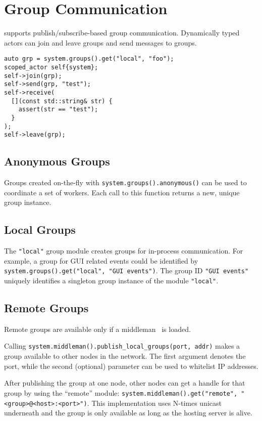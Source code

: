 \section{Group Communication}
\label{groups}

\lib supports publish/subscribe-based group communication.
Dynamically typed actors can join and leave groups and send messages to groups.

\begin{lstlisting}
auto grp = system.groups().get("local", "foo");
scoped_actor self{system};
self->join(grp);
self->send(grp, "test");
self->receive(
  [](const std::string& str) {
    assert(str == "test");
  }
);
self->leave(grp);
\end{lstlisting}

\subsection{Anonymous Groups}
\label{anonymous-group}

Groups created on-the-fly with \lstinline^system.groups().anonymous()^ can be used to coordinate a set of workers.
Each call to this function returns a new, unique group instance.

\subsection{Local Groups}
\label{local-group}

The \lstinline^"local"^ group module creates groups for in-process communication.
For example, a group for GUI related events could be identified by \lstinline^system.groups().get("local", "GUI events")^.
The group ID \lstinline^"GUI events"^ uniquely identifies a singleton group instance of the module \lstinline^"local"^.

\subsection{Remote Groups}
\label{remote-group}

Remote groups are available only if a middleman~ is loaded.

Calling \lstinline^system.middleman().publish_local_groups(port, addr)^ makes a group available to other nodes in the network. The first argument denotes the port, while the second (optional) parameter can be used to whitelist IP addresses.

After publishing the group at one node, other nodes can get a handle for that group by using the ``remote'' module:  \lstinline^system.middleman().get("remote", "<group>@<host>:<port>")^. This implementation uses N-times unicast underneath and the group is only available as long as the hosting server is alive.

